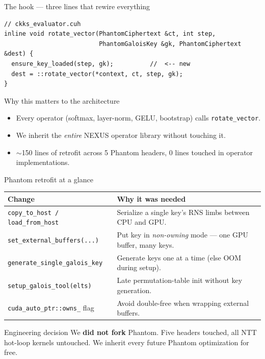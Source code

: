 \documentclass[aspectratio=169]{beamer}
\begin{document}
\begin{frame}[fragile]{The hook — three lines that rewire everything}
  \begin{lstlisting}
// ckks_evaluator.cuh
inline void rotate_vector(PhantomCiphertext &ct, int step,
                          PhantomGaloisKey &gk, PhantomCiphertext &dest) {
  ensure_key_loaded(step, gk);          //  <-- new
  dest = ::rotate_vector(*context, ct, step, gk);
}
  \end{lstlisting}
  \pause
  \begin{block}{Why this matters to the architecture}
    \begin{itemize}
      \item Every operator (softmax, layer-norm, GELU, bootstrap) calls
            \texttt{rotate\_vector}.
      \item We inherit the \emph{entire} NEXUS operator library without touching it.
      \item $\sim$150 lines of retrofit across 5 Phantom headers, 0 lines
            touched in operator implementations.
    \end{itemize}
  \end{block}
\end{frame}

\begin{frame}{Phantom retrofit at a glance}
  \scriptsize
  \begin{tabular}{@{}p{4.3cm}p{7.5cm}@{}}
    \toprule
    \textbf{Change} & \textbf{Why it was needed} \\
    \midrule
    \texttt{copy\_to\_host / load\_from\_host} & Serialize a single key's RNS limbs between CPU and GPU. \\
    \texttt{set\_external\_buffers(...)} & Put key in \emph{non-owning} mode — one GPU buffer, many keys. \\
    \texttt{generate\_single\_galois\_key} & Generate keys one at a time (else OOM during setup). \\
    \texttt{setup\_galois\_tool(elts)} & Late permutation-table init without key generation. \\
    \texttt{cuda\_auto\_ptr::owns\_} flag & Avoid double-free when wrapping external buffers. \\
    \bottomrule
  \end{tabular}
  \vspace{1em}
  \begin{block}{Engineering decision}
    \small
    We \textbf{did not fork} Phantom. Five headers touched, all NTT hot-loop
    kernels untouched. We inherit every future Phantom optimization for free.
  \end{block}
\end{frame}
\end{document}
